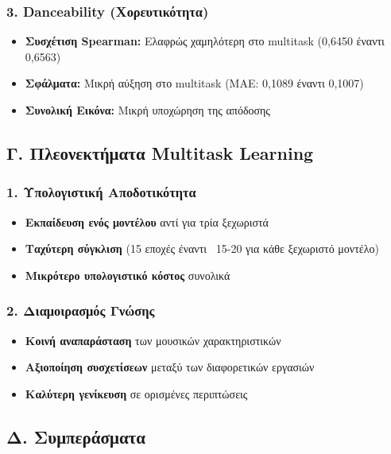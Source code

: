 \documentclass[a4paper,12pt]{article}
\begin{document}
\subsubsection*{3. Danceability (Χορευτικότητα)}
\begin{itemize}
    \item \textbf{Συσχέτιση Spearman:} Ελαφρώς χαμηλότερη στο multitask (0,6450 έναντι 0,6563)
    \item \textbf{Σφάλματα:} Μικρή αύξηση στο multitask (MAE: 0,1089 έναντι 0,1007)
    \item \textbf{Συνολική Εικόνα:} Μικρή υποχώρηση της απόδοσης
\end{itemize}

\subsection*{Γ. Πλεονεκτήματα Multitask Learning}

\subsubsection*{1. Υπολογιστική Αποδοτικότητα}
\begin{itemize}
    \item \textbf{Εκπαίδευση ενός μοντέλου} αντί για τρία ξεχωριστά
    \item \textbf{Ταχύτερη σύγκλιση} (15 εποχές έναντι ~15-20 για κάθε ξεχωριστό μοντέλο)
    \item \textbf{Μικρότερο υπολογιστικό κόστος} συνολικά
\end{itemize}

\subsubsection*{2. Διαμοιρασμός Γνώσης}
\begin{itemize}
    \item \textbf{Κοινή αναπαράσταση} των μουσικών χαρακτηριστικών
    \item \textbf{Αξιοποίηση συσχετίσεων} μεταξύ των διαφορετικών εργασιών
    \item \textbf{Καλύτερη γενίκευση} σε ορισμένες περιπτώσεις
\end{itemize}

\subsection*{Δ. Συμπεράσματα}
\end{document}
